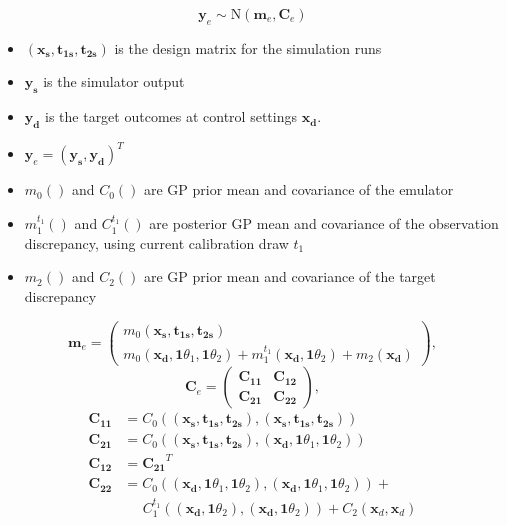 \documentclass[12pt]{article}
\begin{document}
\begin{minipage}{.9\textwidth}
	\[\mathbf y_e\sim \mathrm{N}(\mathbf m_e,\mathbf C_e)\]
	\begin{itemize}
		\setlength\itemsep{0em}
		\item $(\mathbf{x_s},\mathbf{t_{1s}},\mathbf{t_{2s}})$ is the design matrix for the simulation runs
		\item $\mathbf{y_s}$ is the simulator output
		\item $\mathbf {y_d}$ is the target outcomes at control settings $\mathbf {x_d}$.
		\item  $\mathbf y_e = (\mathbf{y_s},\mathbf{y_d})^T$
		\item $m_0()$ and $C_0()$ are GP prior mean and covariance of the emulator
		\item $m^{t_1}_1()$ and $C^{t_1}_1()$ are posterior GP mean and covariance of the observation discrepancy, using current calibration draw $t_1$
		\item $m_2()$ and $C_2()$ are GP prior mean and covariance of the target discrepancy
	\end{itemize}
	\[
	\mathbf m_e = \begin{pmatrix}
	m_0(\mathbf{x_s},\mathbf{t_{1s}},\mathbf{t_{2s}})\\
	m_0(\mathbf{x_d},\mathbf1\theta_1,\mathbf1\theta_2) + m^{t_1}_1(\mathbf{x_d},\mathbf1\theta_2) + m_2(\mathbf{x_d})
	\end{pmatrix},
	\]
	\[
	\mathbf C_e = \begin{pmatrix}
	\mathbf{C_{11}} & \mathbf{C_{12}} \\
	\mathbf{C_{21}} & \mathbf{C_{22}}
	\end{pmatrix},
	\]
	\vspace{-1.5em}
	\begin{align*}
	\mathbf{C_{11}}&=C_0\left((\mathbf{x_s},\mathbf{t_{1s}},\mathbf{t_{2s}}),(\mathbf{x_s},\mathbf{t_{1s}},\mathbf{t_{2s}})\right)\\
	\mathbf{C_{21}}&=C_0\left((\mathbf{x_s},\mathbf{t_{1s}},\mathbf{t_{2s}}),(\mathbf{x_d},\mathbf1\theta_1,\mathbf1\theta_2)\right)\\
	\mathbf{C_{12}}&=\mathbf{C_{21}}^T\\
	\mathbf{C_{22}}&=C_0\left((\mathbf{x_d},\mathbf1\theta_1,\mathbf1\theta_2),(\mathbf{x_d},\mathbf1\theta_1,\mathbf1\theta_2)\right) + \\
	&\phantom{iiii}C^{t_1}_1\left( (\mathbf{x_d},\mathbf1\theta_2),(\mathbf{x_d},\mathbf1\theta_2) \right) + C_2\left(\mathbf x_d,\mathbf x_d \right)\\
	\end{align*}
\end{minipage}

%

%
\end{document}
